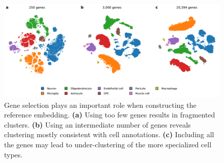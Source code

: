 \documentclass[runningheads]{llncs}
\begin{document}
\begin{figure}[htbp]
  \includegraphics[width=\textwidth]{hrvatin_embedding_tsne_genes.pdf}
  \caption{Gene selection plays an important role when constructing the
  reference embedding. {\bf (a)} Using too few genes results in fragmented
  clusters. {\bf (b)} Using an intermediate number of genes reveals clustering
  mostly consistent with cell annotations. {\bf (c)} Including all the genes
  may lead to under-clustering of the more specialized cell types.}
  \label{fig:gene_selection}
\end{figure}
\end{document}
